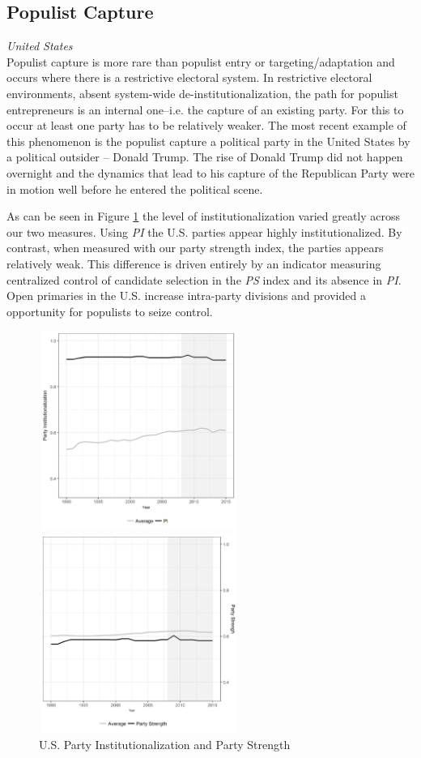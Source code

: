 \documentclass[a4paper,12pt]{article}\usepackage[]{graphicx}\usepackage[]{color}
\begin{document}
\subsection*{Populist Capture}
\noindent
\textit{United States}\\
Populist capture is more rare than populist entry or targeting/adaptation and occurs where there is a restrictive electoral system. In restrictive electoral environments, absent system-wide de-institutionalization, the path for populist entrepreneurs is an internal one--i.e. the capture of an existing party. For this to occur at least one party has to be relatively weaker. The most recent example of this phenomenon is the populist capture a political party in the United States by a political outsider -- Donald Trump. The rise of Donald Trump did not happen overnight and the dynamics that lead to his capture of the Republican Party were in motion well before he entered the political scene. 
\par
As can be seen in Figure \ref{usapsi} the level of institutionalization varied greatly across our two measures. Using \textit{PI} the U.S. parties appear highly institutionalized. By contrast, when measured with our party strength index, the parties appears relatively weak. This difference is driven entirely by an indicator measuring centralized control of candidate selection in the \textit{PS} index and its absence in \textit{PI}. Open primaries in the U.S. increase intra-party divisions and provided a opportunity for populists to seize control. 
\begin{figure}[H]%
\centering
\parbox{2.5in}{\includegraphics[width=65mm, height=65mm]{usa1.jpg}}%
\qquad
\begin{minipage}{2in}%
\includegraphics[width=65mm, height=65mm]{usa2.jpg}
\end{minipage}%
\caption{U.S. Party Institutionalization and Party Strength}%
\label{usapsi}%
\end{figure}
\end{document}
